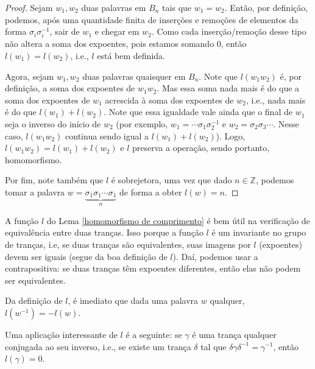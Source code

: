 	\begin{proof}
		Sejam $w_1,w_2$ duas palavras em $B_n$ tais que $w_1=w_2$. Então, por definição, podemos, 
		após uma quantidade finita de inserções e remoções de elementos da forma $\sigma_i\sigma_i^{-1}$, 
		sair de $w_1$ e chegar em $w_2$. Como cada inserção/remoção desse tipo não altera a soma dos expoentes,
		pois estamos somando 0, então $l(w_1)=l(w_2)$, i.e., $l$ está bem definida. 
		
		\par\vspace{0.3cm} Agora, sejam $w_1,w_2$ duas palavras quaisquer em $B_n$. Note que $l(w_1w_2)$ é, 
		por definição, a soma dos expoentes de $w_1w_2$. Mas essa soma nada mais é do que a soma dos expoentes 
		de $w_1$ acrescida à soma dos expoentes de $w_2$, i.e., nada mais é do que $l(w_1)+l(w_2)$. Note que 
		essa igualdade vale ainda que o final de $w_1$ seja o inverso do início de $w_2$ (por exemplo, 
		$w_1 = \cdots\sigma_1\sigma_2^{-1}$ e $w_2 = \sigma_2\sigma_3\cdots$. Nesse caso, $l(w_1w_2)$ 
		continua sendo igual a $l(w_1) + l(w_2)$). Logo, $l(w_1w_2)=l(w_1)+l(w_2)$ e $l$ preserva a operação, 
		sendo portanto, homomorfismo.
		
		\par\vspace{0.3cm} Por fim, note também que $l$ é sobrejetora, uma vez que dado $n\in\mathbb{Z}$, 
		podemos tomar a palavra $w = \underbrace{\sigma_1\sigma_1\cdots\sigma_1}_{n}$ de forma a obter $l(w) = n$.
	\end{proof}
	\begin{remark}
		A função $l$ do Lema \eqref{homomorfismo de comprimento} é bem útil na verificação de equivalência 
		entre duas tranças. Isso porque a função $l$ é um invariante no grupo de tranças, i.e, se duas tranças 
		são equivalentes, suas imagens por $l$ (expoentes) devem ser iguais (segue da boa definição de $l$). 
		Daí, podemos usar a contrapositiva: se duas tranças têm expoentes diferentes, então elas não podem 
		ser equivalentes.
	\end{remark}
	\par\vspace{0.3cm} Da definição de $l$, é imediato que dada uma palavra $w$ qualquer, $l(w^{-1}) = -l(w)$.
	
	\par\vspace{0.3cm} Uma aplicação interessante de $l$ é a seguinte: se $\gamma$ é uma trança qualquer 
	conjugada ao seu inverso, i.e., se existe um trança $\delta$ tal que $\delta\gamma\delta^{-1} = \gamma^{-1}$,
	então $l(\gamma) = 0$.
	
